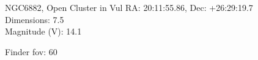 \begin{block}{NGC6882, Open Cluster in Vul}
    RA: 20:11:55.86, Dec: +26:29:19.7 \\ 
    Dimensions: 7.5 \\ 
    Magnitude (V): 14.1



    Finder fov: 60 

     
\end{block}